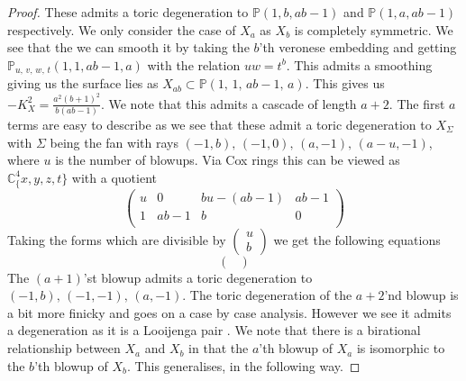\documentclass[11pt]{amsbook}
\theoremstyle{definition}
\theoremstyle{definition}
\theoremstyle{definition}
\theoremstyle{definition}
\theoremstyle{definition}
\theoremstyle{definition}
\theoremstyle{definition}
\theoremstyle{definition}
\newcommand{\mb}[1]{\mathbb{#1}}
\newcommand{\LJ}{Looijenga pair }
\begin{document}
\begin{proof}
 These admits a toric degeneration to $\mb{P}(1, b, ab-1)$ and $\mb{P}(1, a, ab-1)$ respectively. We only consider the case of $X_a$ as $X_b$ is completely symmetric. We see that the we can smooth it by taking the $b$'th veronese embedding and  getting $\mb{P}_{u,\,v,\,w,\,t}(1, 1, ab-1, a)$ with the relation $uw = t^b$. This admits a smoothing giving us the surface lies as $X_{ab} \subset \mb{P}(1,\, 1, \, ab-1, \, a)$. This gives us $-K_X^2 = \frac{a^2(b+1)^2}{b(ab-1)}$. We note that this admits a cascade of length $a+2$. The first $a$ terms are easy to describe as we see that these admit a toric degeneration to $X_\Sigma$ with $\Sigma$ being the fan with rays $(-1, b), \, (-1, 0), \, (a, -1), \, (a-u, -1)$, where $u$ is the number of blowups. 
Via Cox rings this can be viewed as $\mb{C}^4_\{x, y,z,t\}$ with a quotient 
\[
\left(
\begin{matrix}
u & 0 & bu - (ab-1) & ab-1 \\
1 & ab-1 & b & 0 \\
\end{matrix}
\right)
\]
Taking the forms which are divisible by $\left( \begin{matrix}u \\ b \end{matrix} \right)$ we get the following equations 
\[
\left(
\begin{matrix}

\end{matrix}
\right)
\]
 The $(a+1)$'st blowup admits a toric degeneration to $(-1, b), \, (-1, -1), \, (a, -1)$. The toric degeneration of the $a+2$'nd blowup is a bit more finicky and goes on a case by case analysis. However we see it admits a degeneration as it is a \LJ. We note that there is a birational relationship between $X_a$ and $X_b$ in that the $a$'th blowup of $X_a$ is isomorphic to the $b$'th blowup of $X_b$.  This generalises, in the following way. 
\end{proof}
\end{document}
